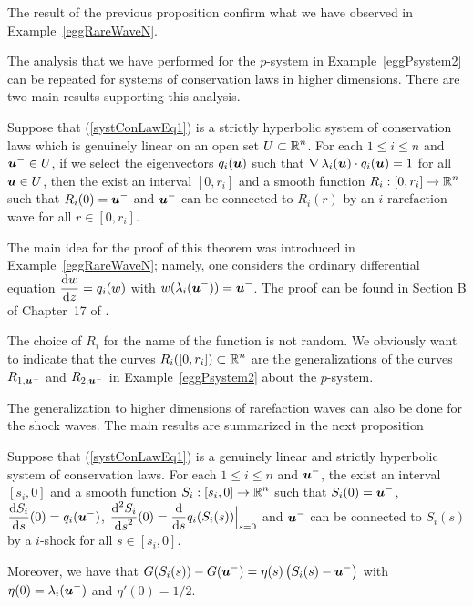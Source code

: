 The result of the previous proposition confirm what we have observed
in Example~\ref{eggRareWaveN}.

The analysis that we have performed for the $p$-system in 
Example~\ref{eggPsystem2} can be repeated for systems of conservation
laws in higher dimensions.  There are two main results supporting this
analysis.

\begin{theorem}
Suppose that (\ref{systConLawEq1}) is a strictly hyperbolic system of
conservation laws which is genuinely linear on an open set
$\DS U \subset \RR^n$.  For each $1 \leq i \leq n$ and
$\DS \VEC{u}^- \in U$,
if we select the eigenvectors $q_i(\VEC{u})$ such
that $\graD \lambda_i(\VEC{u}) \cdot q_i(\VEC{u}) = 1$ for all
$\VEC{u} \in U$, then the exist an interval $[0,r_i]$ and a smooth function
$\DS R_i: [0,r_i] \to \RR^n$ such that
$\DS R_i(0) = \VEC{u}^-$ and
$\DS \VEC{u}^-$ can be connected to $R_i(r)$ by an
$i$-rarefaction wave for all $r \in [0,r_i]$.
\end{theorem}

The main idea for the proof of this theorem was introduced in
Example~\ref{eggRareWaveN}; namely, one considers the ordinary
differential equation $\DS \dydx{w}{z} = q_i(w)$ with
$\DS w(\lambda_i(\VEC{u}^-)) = \VEC{u}^-$.
The proof can be found in Section B of Chapter~17 of \cite{Smo}.

The choice of $R_i$ for the name of the function is not random.  We
obviously want to indicate that the curves
$\DS R_i([0,r_i]) \subset \RR^n$
are the generalizations of the curves $R_{1,\VEC{u}^-}$ and $R_{2,\VEC{u}^-}$ in
Example~\ref{eggPsystem2} about the $p$-system.

The generalization to higher dimensions of rarefaction waves can also
be done for the shock waves.  The main results are summarized in the
next proposition

\begin{theorem}  \label{genHugCurve}
Suppose that (\ref{systConLawEq1}) is a genuinely linear and strictly
hyperbolic system of conservation laws.  For each $1 \leq i \leq n$
and $\DS \VEC{u}^-$, the exist an interval $[s_i,0]$ and a
smooth function $\DS S_i: [s_i,0] \to \RR^n$ such that
$\DS S_i(0) = \VEC{u}^-$,
$\DS \dydx{S_i}{s}(0) = q_i(\VEC{u}^-)$,
$\DS \dydxn{S_i}{s}{2}(0) = \dfdx{q_i(S_i(s))}{s}\Big|_{s=0}$
and $\DS \VEC{u}^-$ can be connected to $S_i(s)$ by a $i$-shock
for all $s \in [s_i,0]$.

Moreover, we have that
$\DS G(S_i(s))-G(\VEC{u}^-)
= \eta(s) \left(S_i(s) - \VEC{u}^-\right)$
with $\DS \eta(0) = \lambda_i(\VEC{u}^-)$ and $\eta'(0) = 1/2$.
\end{theorem}

